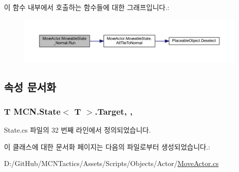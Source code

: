 이 함수 내부에서 호출하는 함수들에 대한 그래프입니다.\+:\nopagebreak
\begin{figure}[H]
\begin{center}
\leavevmode
\includegraphics[width=350pt]{class_move_actor_1_1_moveable_state___normal_a687176bd566ec3493d38fb51d6f5de5f_cgraph}
\end{center}
\end{figure}




\subsection{속성 문서화}
\subsubsection[{\texorpdfstring{Target}{Target}}]{\setlength{\rightskip}{0pt plus 5cm}T {\bf M\+C\+N.\+State}$<$ T $>$.Target\hspace{0.3cm}{\ttfamily [get]}, {\ttfamily [protected]}, {\ttfamily [inherited]}}\hypertarget{class_m_c_n_1_1_state_a93ba2fd920292031bd6e65b1dc505cb3}{}\label{class_m_c_n_1_1_state_a93ba2fd920292031bd6e65b1dc505cb3}


State.\+cs 파일의 32 번째 라인에서 정의되었습니다.



이 클래스에 대한 문서화 페이지는 다음의 파일로부터 생성되었습니다.\+:\begin{DoxyCompactItemize}
\item 
D\+:/\+Git\+Hub/\+M\+C\+N\+Tactics/\+Assets/\+Scripts/\+Objects/\+Actor/\hyperlink{_move_actor_8cs}{Move\+Actor.\+cs}\end{DoxyCompactItemize}
